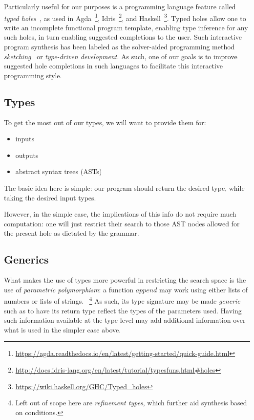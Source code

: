 \documentclass{article}
\begin{document}
Particularly useful for our purposes is a programming language feature called \emph{typed holes}~\citep{hashimoto1997typed},
as used in Agda~\footnote{\url{https://agda.readthedocs.io/en/latest/getting-started/quick-guide.html}},
Idris~\footnote{\url{http://docs.idris-lang.org/en/latest/tutorial/typesfuns.html\#holes}},
and Haskell~\footnote{\url{https://wiki.haskell.org/GHC/Typed_holes}}.
Typed holes allow one to write an incomplete functional program template,
enabling type inference for any such holes, in turn enabling suggested completions to the user.
Such interactive program synthesis has been labeled as the solver-aided
programming method \emph{sketching}~\citep{gulwani2017program} or
\emph{type-driven development}.
As such, one of our goals is to improve suggested hole completions in such languages to facilitate this interactive programming style.

\subsection{Types}

To get the most out of our types, we will want to provide them for:
\begin{itemize}
    \item inputs
    \item outputs
    \item abstract syntax trees (ASTs)
\end{itemize}

The basic idea here is simple: our program should return the desired type, while taking the desired input types.

However, in the simple case, the implications of this info do not require much computation:
one will just restrict their search to those AST nodes allowed for the present hole as dictated by the grammar.

\subsection{Generics}

What makes the use of types more powerful in restricting the search space is the use of \emph{parametric polymorphism}:
a function $append$ may work using either lists of numbers or lists of strings.
~\footnote{Left out of scope here are \emph{refinement types}, which further aid synthesis based on conditions.}
As such, its type signature may be made \emph{generic} such as to have its return type reflect the types of the parameters used.
Having such information available at the type level may add additional information over what is used in the simpler case above.
\end{document}
